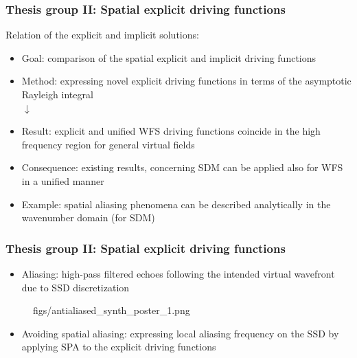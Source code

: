 \documentclass{beamer}
\begin{document}
\begin{frame}
\frametitle{Thesis group II: Spatial explicit driving functions}
Relation of the explicit and implicit solutions:
 \vspace{3mm}
\begin{itemize}
\item Goal: comparison of the spatial explicit and implicit driving functions
\vspace{3mm}
\item Method: expressing novel explicit driving functions in terms of the asymptotic Rayleigh integral
\\ \hspace{4.5cm} $\downarrow$ \hspace{2cm} \\
\end{itemize}
\begin{tcolorbox}
\begin{itemize}
\item Result: explicit and unified WFS driving functions coincide in the high frequency region for general virtual fields
 \vspace{3mm}
\end{itemize}
\end{tcolorbox}
\begin{itemize}
\item Consequence: {\color{blue} existing results, concerning SDM can be applied also for WFS in a unified manner}
 \vspace{3mm}
\item Example: spatial aliasing phenomena can be described analytically in the wavenumber domain (for SDM)
\end{itemize}
\end{frame}

\begin{frame}
\frametitle{Thesis group II: Spatial explicit driving functions}
\begin{itemize}
\item Aliasing: high-pass filtered echoes following the intended virtual wavefront due to SSD discretization
\end{itemize}
	\vspace{-3.5mm}	
	\begin{figure}
	\centering
	\begin{overpic}[width = 0.65\columnwidth ]{figs/antialiased_synth_poster_1.png}
	\end{overpic}
	\end{figure} 
	\vspace{-7mm}
		\begin{itemize}
		\item Avoiding spatial aliasing: expressing local aliasing frequency on the SSD by applying SPA to the explicit driving functions
		\end{itemize}
\end{frame}
\end{document}
